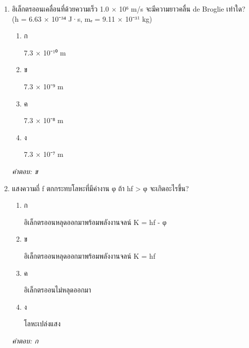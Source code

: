 \documentclass[12pt]{article}
\begin{document}
\begin{enumerate}[label=\arabic*., itemsep=0.5\baselineskip, topsep=0.5\baselineskip, leftmargin=*]
\item อิเล็กตรออนเคลื่อนที่ด้วยความเร็ว 1.0 × 10⁶ m/s จะมีความยาวคลื่น de Broglie เท่าใด? (h = 6.63 × 10⁻³⁴ J·s, mₑ = 9.11 × 10⁻³¹ kg)
\begin{enumerate}[label=\alph*)., itemsep=0.3\baselineskip, topsep=0.3\baselineskip]
\item ก\ 
\begin{minipage}[t]{0.9\linewidth}
\raggedright 7.3 × 10⁻¹⁰ m
\end{minipage}
\item ข\ 
\begin{minipage}[t]{0.9\linewidth}
\raggedright 7.3 × 10⁻⁹ m
\end{minipage}
\item ค\ 
\begin{minipage}[t]{0.9\linewidth}
\raggedright 7.3 × 10⁻⁸ m
\end{minipage}
\item ง\ 
\begin{minipage}[t]{0.9\linewidth}
\raggedright 7.3 × 10⁻⁷ m
\end{minipage}
\end{enumerate}
\vspace{-0.3\baselineskip}
\begin{small}
\textit{คำตอบ: ข}
\end{small}

\item แสงความถี่ f ตกกระทบโลหะที่มีค่างาน φ ถ้า hf > φ จะเกิดอะไรขึ้น?
\begin{enumerate}[label=\alph*)., itemsep=0.3\baselineskip, topsep=0.3\baselineskip]
\item ก\ 
\begin{minipage}[t]{0.9\linewidth}
\raggedright อิเล็กตรออนหลุดออกมาพร้อมพลังงานจลน์ K = hf - φ
\end{minipage}
\item ข\ 
\begin{minipage}[t]{0.9\linewidth}
\raggedright อิเล็กตรออนหลุดออกมาพร้อมพลังงานจลน์ K = hf
\end{minipage}
\item ค\ 
\begin{minipage}[t]{0.9\linewidth}
\raggedright อิเล็กตรออนไม่หลุดออกมา
\end{minipage}
\item ง\ 
\begin{minipage}[t]{0.9\linewidth}
\raggedright โลหะเปล่งแสง
\end{minipage}
\end{enumerate}
\vspace{-0.3\baselineskip}
\begin{small}
\textit{คำตอบ: ก}
\end{small}


\end{enumerate}
\end{document}
